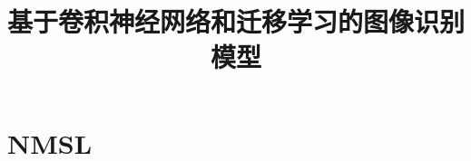 \documentclass[lang=cn,11pt]{elegantpaper}
\title{基于卷积神经网络和迁移学习的图像识别模型}
\date{}
\begin{document}
\newpage
\maketitle

\vspace{-25pt}
\begin{abstract}



\end{abstract}
\keywords{}
	
\tableofcontents
\thispagestyle{empty}
\newpage
\normalsize
{}


\section{NMSL}




\newpage
\nocite{*}



\end{document}
